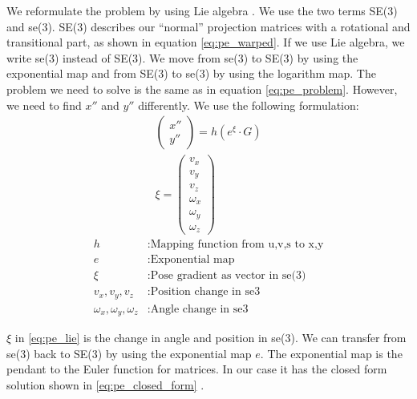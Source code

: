 \documentclass[11pt,a4paper,titlepage,oneside]{report}
\begin{document}
We reformulate the problem by using Lie algebra \cite{se3_explain}. We use the two terms SE(3) and se(3). SE(3) describes our ``normal'' projection matrices with a rotational and transitional part, as shown in equation \ref{eq:pe_warped}. If we use Lie algebra, we write se(3) instead of SE(3). We move from se(3) to SE(3) by using the exponential map and from SE(3) to se(3) by using the logarithm map. The problem we need to solve is the same as in equation \ref{eq:pe_problem}. However, we need to find $x''$ and $y''$ differently. We use the following formulation:
\begin{equation}\label{eq:pe_lie}
  \begin{gathered}
    \begin{pmatrix}
      x''\\
      y''
    \end{pmatrix}
    =h(e^{\xi} \cdot G)\\
    \xi=\begin{pmatrix}
      v_x\\
      v_y\\
      v_z\\
      \omega_x\\
      \omega_y\\
      \omega_z
    \end{pmatrix}
  \end{gathered}
\end{equation}
\begin{align*}
  h                            &: \text{Mapping function from u,v,s to x,y}\\
  e                            &: \text{Exponential map}\\
  \xi                          &: \text{Pose gradient as vector in se(3)}\\
  v_x,v_y,v_z                  &: \text{Position change in se3}\\
  \omega_x,\omega_y,\omega_z   &: \text{Angle change in se3}
\end{align*}

$\xi$ in \ref{eq:pe_lie} is the change in angle and position in se(3). We can transfer from se(3) back to SE(3) by using the exponential map $e$. The exponential map is the pendant to the Euler function for matrices. In our case it has the closed form solution shown in \ref{eq:pe_closed_form} \cite{rvc}.
\end{document}
